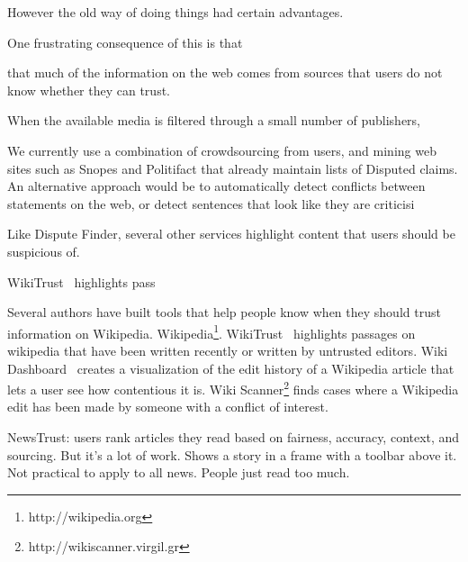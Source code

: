 
However the old way of doing things had certain advantages. 

One frustrating consequence of this is that 

 that much of the information on the web comes from sources that users do not know whether they can trust. 

When the available media is filtered through a small number of publishers, 

 


We currently use a combination of crowdsourcing from users, and mining web sites such as Snopes and Politifact that already maintain lists of Disputed claims. An alternative approach would be to automatically detect conflicts between statements on the web, or detect sentences that look like they are criticisi 



Like Dispute Finder, several other services highlight content that users should be suspicious of. 

WikiTrust~\cite{Adler2008a} highlights pass

Several authors have built tools that help people know when they should trust information on Wikipedia. Wikipedia\footnote{http://wikipedia.org}. WikiTrust~\cite{Adler2008a} highlights passages on wikipedia that have been written recently or written by untrusted editors. Wiki Dashboard~\cite{Kittur2008} creates a visualization of the edit history of a Wikipedia article that lets a user see how contentious it is. Wiki Scanner\footnote{http://wikiscanner.virgil.gr} finds cases where a Wikipedia edit has been made by someone with a conflict of interest. 








NewsTrust: users rank articles they read based on fairness, accuracy, context, and sourcing. But it's a lot of work. Shows a story in a frame with a toolbar above it. Not practical to apply to all news. People just read too much.



